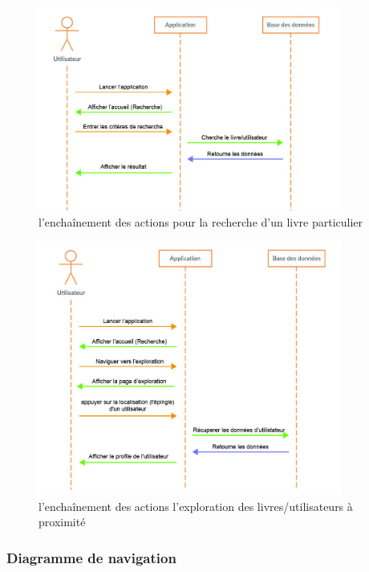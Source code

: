\begin{figure}[H]
	\centering
		\includegraphics[width=10cm]{Images/chapter3/rechercher_un_livre.jpg}
		\caption{{\footnotesize l'enchaînement des actions pour la recherche d'un  livre particulier}}
\end{figure}

\begin{figure}[H]
	\centering
		\includegraphics[width=10cm]{Images/chapter3/explorer_les_livres.jpg}
		\caption{{\footnotesize l'enchaînement des actions l'exploration des livres/utilisateurs à proximité}}
\end{figure}

\newpage

\subsubsection{Diagramme de navigation}

